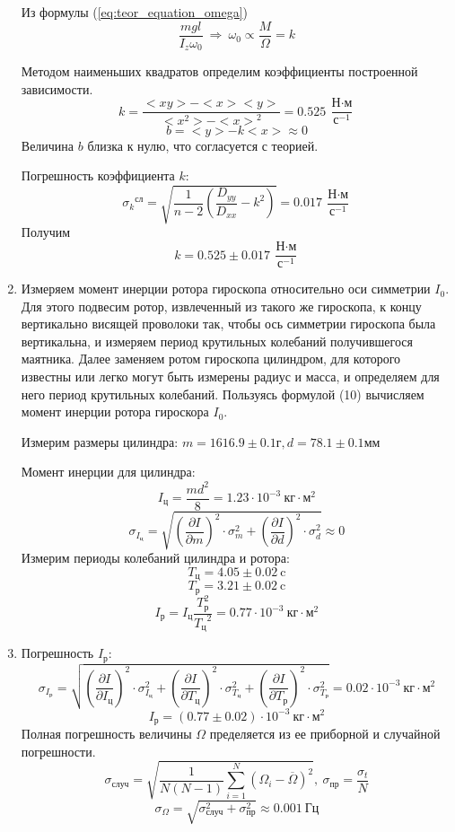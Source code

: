 \documentclass[a4paper,12pt]{article}
\begin{document}
\begin{enumerate}
	Из формулы (\ref{eq:teor_equation_omega})
	$$
	\frac{mgl}{I_z\omega_0}~\Rightarrow~\omega_0\propto\frac{M}{\Omega} = k
	$$

	Методом наименьших квадратов определим коэффициенты построенной зависимости.
	$$
	k = \frac{<x y> - <x> <y>}{<x^2> - {<x>}^2} = 0.525~\frac{\text{Н$\cdot$м}}{\text{с$^{-1}$}}
	$$
	$$
	b = <y> - k<x> \approx 0
	$$
	Величина $b$ близка к нулю, что согласуется с теорией.

	Погрешность коэффициента $k$:
	$$
	{\sigma_k}^{\text{сл}}= \sqrt{\frac{1}{n-2}\left(\frac{D_{yy}}{D_{xx}} - k^2 \right)} = 0.017~\frac{\text{Н$\cdot$м}}{\text{с$^{-1}$}}
	$$
	Получим
	$$
	k = 0.525\pm 0.017~\frac{\text{Н$\cdot$м}}{\text{с$^{-1}$}}
	$$
	\item Измеряем момент инерции ротора гироскопа относительно оси симметрии $I_0$. Для этого подвесим ротор, извлеченный из такого же гироскопа, к концу вертикально висящей проволоки так, чтобы ось симметрии гироскопа была вертикальна, и измеряем период крутильных колебаний получившегося маятника. Далее заменяем ротом гироскопа цилиндром, для которого известны или легко могут быть измерены радиус и масса, и определяем для него период крутильных колебаний. Пользуясь формулой (10) вычисляем момент инерции ротора гироскора $I_0$.

	Измерим размеры цилиндра: $m = 1616.9 \pm 0.1 \text{г}, d = 78.1 \pm 0.1 \text{мм}$ 
	
	Момент инерции для цилиндра:
	$$
	I_{\text{ц}} = \frac{md^2}{8} = 1.23\cdot10^{-3}~\text{кг$\cdot$м$^2$}
	$$
	$$
	\sigma_{I_{\text{ц}}} = \sqrt{\left(\frac{\partial{I}}{\partial{m}}\right)^2\cdot\sigma_m^2 + \left(\frac{\partial{I}}{\partial{d}}\right)^2\cdot \sigma_d^2} \approx 0
	$$
	Измерим периоды колебаний цилиндра и ротора:
	$$
	T_{\text{ц}} = 4.05\pm 0.02~\text{c}
	$$
	$$
	T_{\text{р}} = 3.21\pm 0.02~\text{c}
	$$
	$$
	I_{\text{р}}= I_{\text{ц}}\frac{T_{\text{р}}^2}{{T_{\text{ц}}}^2} = 0.77\cdot10^{-3}~\text{кг$\cdot$м$^2$}
	$$

	\item
	
	Погрешность $I_{\text{р}}$:
	$$
	\sigma_{I_{\text{р}}} = \sqrt{\left(\frac{\partial{I}}{\partial{I_{\text{ц}}}}\right)^2\cdot\sigma_{I_{\text{ц}}}^2 + \left(\frac{\partial{I}}{\partial{T_{\text{ц}}}}\right)^2\cdot \sigma_{T_{\text{ц}}}^2 + \left(\frac{\partial{I}}{\partial{T_{\text{р}}}}\right)^2\cdot \sigma_{T_{\text{р}}}^2} = 0.02\cdot 10^{-3}~\text{кг$\cdot$м$^2$}
	$$
	$$
	I_{\text{р}} = (0.77\pm 0.02)\cdot 10^{-3}~\text{кг$\cdot$м$^2$}
	$$
	Полная погрешность величины $\Omega$ пределяется из ее приборной и случайной погрешности.
	$$
	\sigma_{\text{случ}} = \sqrt{\frac{1}{N(N-1)}\sum_{i = 1}^{N} (\Omega_i - \overline{\Omega})^2},~\sigma_{\text{пр}} = \frac{\sigma_t}{N}
	$$
	$$
	\sigma_{\Omega} = \sqrt{\sigma_{\text{случ}}^2 + \sigma_{\text{пр}}^2}\approx 0.001~\text{Гц}
	$$


\end{enumerate}
\end{document}
